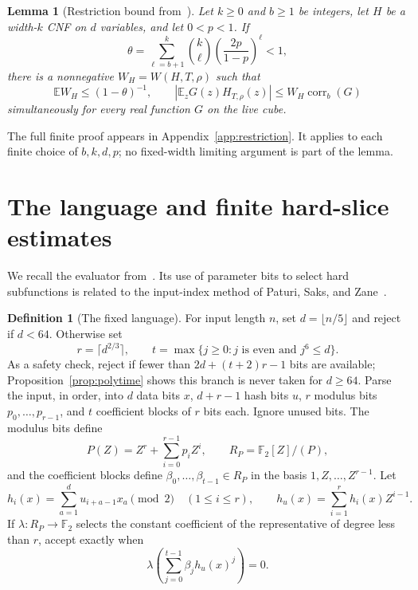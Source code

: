 \documentclass[11pt,letterpaper]{article}
\newtheorem{lemma}[theorem]{Lemma}
\theoremstyle{definition}
\newtheorem{definition}[theorem]{Definition}
\numberwithin{equation}{section}
\newcommand{\E}{\mathbb E}
\DeclareMathOperator{\corr}{corr}
\begin{document}
\begin{lemma}[Restriction bound from~\cite{OAI26}]\label{lem:restriction}
Let $k\ge0$ and $b\ge1$ be integers, let $H$ be a width-$k$ CNF on $d$
variables, and let $0<p<1$. If
\begin{equation}\label{eq:theta}
 \theta=\sum_{\ell=b+1}^k\binom{k}{\ell}
             \left(\frac{2p}{1-p}\right)^\ell<1,
\end{equation}
there is a nonnegative $W_H=W(H,T,\rho)$ such that
\[
 \E W_H\le(1-\theta)^{-1},\qquad
 |\E_z G(z)H_{T,\rho}(z)|\le W_H\corr_b(G)
\]
simultaneously for every real function $G$ on the live cube.
\end{lemma}
The full finite proof appears in Appendix~\ref{app:restriction}. It applies
to each finite choice of $b,k,d,p$; no fixed-width limiting argument is
part of the lemma.

\section{The language and finite hard-slice estimates}\label{sec:language}
We recall the evaluator from~\cite[Section~4]{OAI26}. Its use of parameter
bits to select hard subfunctions is related to the input-index method
of Paturi, Saks, and Zane~\cite[Section~5]{PSZ00}.

\begin{definition}[The fixed language]\label{def:language}
For input length $n$, set $d=\lfloor n/5\rfloor$ and reject if $d<64$.
Otherwise set
\[
 r=\lceil d^{2/3}\rceil,\qquad
 t=\max\{j\ge0:j\text{ is even and }j^6\le d\}.
\]
As a safety check, reject if fewer than $2d+(t+2)r-1$ bits are available;
Proposition~\ref{prop:polytime} shows this branch is never taken for $d\ge64$.
Parse the input,
in order, into $d$ data bits $x$, $d+r-1$ hash bits $u$, $r$ modulus bits
$p_0,\ldots,p_{r-1}$, and $t$ coefficient blocks of $r$ bits each.
Ignore unused bits. The modulus bits define
\[
 P(Z)=Z^r+\sum_{i=0}^{r-1}p_iZ^i,
 \qquad R_P=\mathbb F_2[Z]/(P),
\]
and the coefficient blocks define $\beta_0,\ldots,\beta_{t-1}\in R_P$
in the basis $1,Z,\ldots,Z^{r-1}$.
Let
\begin{equation}\label{eq:hash}
 h_i(x)=\sum_{a=1}^d u_{i+a-1}x_a\pmod2\quad(1\le i\le r),
 \qquad h_u(x)=\sum_{i=1}^rh_i(x)Z^{i-1}.
\end{equation}
If $\lambda:R_P\to\mathbb F_2$ selects the constant coefficient of the
representative of degree less than $r$, accept exactly when
\begin{equation}\label{eq:evaluator}
 \lambda\!\left(\sum_{j=0}^{t-1}\beta_jh_u(x)^j\right)=0.
\end{equation}
\end{definition}
\end{document}

